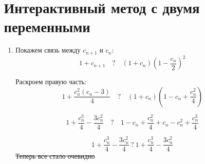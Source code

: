\documentclass{report}
\begin{document}
\section{\textbf{Интерактивный метод с двумя переменными}}
\begin{enumerate}
    \item Покажем связь между $c_{n+1}$ и $c_n$:
    \begin{equation*}
        1 + c_{n+1} \quad ?\quad (1 + c_n)\left(1 - \frac{c_n}{2}\right)^2
    \end{equation*}
    
    Раскроем правую часть:
    \begin{equation*}
        1 + \frac{c_n^2(c_n - 3)}{4}\quad ?\quad (1 + c_n)\left(1 - c_n + \frac{c_n^2}{4}\right)
    \end{equation*}
    
    \begin{equation*}
        1 + \frac{c_n^3}{4} - \frac{3c_n^2}{4} \quad ?\quad 1 - c_n + \frac{c_n^2}{4} + c_n - c_n^2 + \frac{c_n^3}{4}
    \end{equation*}
    
    \begin{equation*}
        1 + \frac{c_n^3}{4} - \frac{3c_n^2}{4} \:?\: 1 + \frac{c_n^3}{4} - \frac{3c_n^2}{4}
    \end{equation*}
    \sout{Теперь все стало очевидно}


\end{enumerate}
\end{document}
